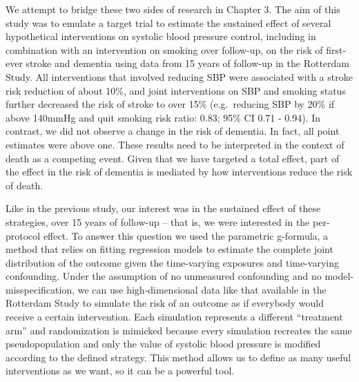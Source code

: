 \documentclass[
]{book}
\begin{document}
We attempt to bridge these two sides of research in Chapter 3. The aim of this study was to emulate a target trial to estimate the sustained effect of several hypothetical interventions on systolic blood pressure control, including in combination with an intervention on smoking over follow-up, on the risk of first-ever stroke and dementia using data from 15 years of follow-up in the Rotterdam Study. All interventions that involved reducing SBP were associated with a stroke risk reduction of about 10\%, and joint interventions on SBP and smoking status further decreased the risk of stroke to over 15\% (e.g.~reducing SBP by 20\% if above 140mmHg and quit smoking risk ratio: 0.83; 95\% CI 0.71 - 0.94). In contrast, we did not observe a change in the risk of dementia. In fact, all point estimates were above one. These results need to be interpreted in the context of death as a competing event. Given that we have targeted a total effect, part of the effect in the risk of dementia is mediated by how interventions reduce the risk of death\autocite{young2020}.

Like in the previous study, our interest was in the sustained effect of these strategies, over 15 years of follow-up -- that is, we were interested in the per-protocol effect. To answer this question we used the parametric g-formula, a method that relies on fitting regression models to estimate the complete joint distribution of the outcome given the time-varying exposures and time-varying confounding\autocite{robins1086,whatif}. Under the assumption of no unmeasured confounding and no model-misspecification, we can use high-dimensional data like that available in the Rotterdam Study to simulate the risk of an outcome as if everybody would receive a certain intervention. Each simulation represents a different ``treatment arm'' and randomization is mimicked because every simulation recreates the same pseudopopulation and only the value of systolic blood pressure is modified according to the defined strategy\autocite{taubman2009,young2011}. This method allows us to define as many useful interventions as we want, so it can be a powerful tool.
\end{document}
